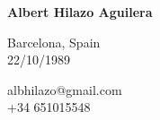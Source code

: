 \noindent
\textbf{\LARGE Albert Hilazo Aguilera}
\medskip

\begin{multicols}{3}
\noindent
Barcelona, Spain \\
22/10/1989

\noindent
albhilazo@gmail.com \\
+34 651015548

\noindent
\href{http://linkedin.com/in/albhilazo}{} \\
\href{http://github.com/albhilazo}{}
\end{multicols}
